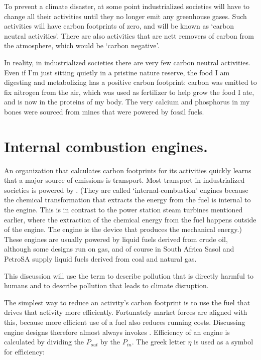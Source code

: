 To prevent a climate disaster, at some point industrialized societies will have
to change all their activities until they no longer emit any greenhouse gases.
Such activities will have carbon footprints of zero, and will be known as
`carbon neutral activities'. There are also activities that are nett removers of
carbon from the atmosphere, which would be `carbon negative'.

In reality, in industrialized societies there are very few carbon neutral
activities. Even if I'm just sitting quietly in a pristine nature reserve, the
food I am digesting and metabolizing has a positive carbon footprint: carbon
was emitted to fix nitrogen from the air, which was used as fertilizer to help
grow the food I ate, and is now in the proteins of my body. The very calcium and
phosphorus in my bones were sourced from mines that were powered by fossil
fuels. 

\section{Internal combustion engines.}

An organization that calculates carbon footprints for its activities quickly
learns that a major source of emissions is transport. Most transport in
industrialized societies is powered by . (They are called `internal\hyp{}combustion' engines because the
chemical transformation that extracts the energy from the fuel is internal to
the engine. This is in contrast to the power station steam turbines mentioned
earlier, where the extraction of the chemical energy from the fuel happens
outside of the engine. The engine is the device that produces the mechanical
energy.) These engines are usually powered by liquid fuels derived from crude
oil, although some designs run on gas, and of course in South Africa Sasol and
PetroSA supply liquid fuels derived from coal and natural gas.

This discussion will use the term  to describe
pollution that is directly harmful to humans and  to
describe pollution that leads to climate disruption.

The simplest way to reduce an activity's carbon footprint is to use the fuel
that drives that activity more efficiently. Fortunately market forces are
aligned with this, because more efficient use of a fuel also reduces running
costs. Discussing engine designs therefore almost always invokes
. Efficiency of an engine is calculated by dividing the
 \(P_{out}\) by the  \(P_{in}\). The
greek letter \(\eta\) is used as a symbol for efficiency:

